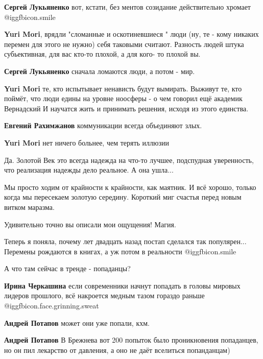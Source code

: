 \begin{itemize}
\begin{itemize}
\textbf{Сергей Лукьяненко} вот, кстати, без ментов созидание действительно хромает  @igg{fbicon.smile} 

\textbf{Yuri Mori}, врядли "сломанные и оскотиневшиеся " люди (ну, те - кому никаких перемен для этого не нужно) себя таковыми считают. Разность людей штука субьективная, для вас кто-то плохой, а для кого- то плохой вы.

\textbf{Сергей Лукьяненко} сначала ломаются люди, а потом - мир.

\textbf{Yuri Mori} те, кто испытывает ненависть будут вымирать. Выживут те, кто поймёт, что люди едины на уровне ноосферы - о чем говорил ещё академик Вернадский
И научатся жить и принимать решения, исходя из этого единства.

\textbf{Евгений Рахимжанов} коммуникации всегда объединяют злых.

\textbf{Yuri Mori} нет ничего больнее, чем терять иллюзии
\end{itemize} %


Да. Золотой Век это всегда надежда на что-то лучшее, подспудная уверенность,
что реализация надежды дело реальное. А она ушла...



Мы просто ходим от крайности к крайности, как маятник. И всё хорошо, только
когда мы пересекаем золотую середину. Короткий миг счастья перед новым витком
маразма.

Удивительно точно вы описали мои ощущения! Магия.


Теперь я поняла, почему лет двадцать назад постап сделался так популярен...
Перемены рождаются в книгах, а уж потом в реальности  @igg{fbicon.smile} 

А что там сейчас в тренде - попаданцы?

\begin{itemize} %
\textbf{Ирина Черкашина} если современники начнут попадать в головы мировых лидеров прошлого, всё накроется медным тазом гораздо раньше  @igg{fbicon.face.grinning.sweat} 

\textbf{Андрей Потапов} может они уже попали, кхм.

\textbf{Андрей Потапов} В Брежнева вот 200 попыток было проникновения попаданцев, но он пил лекарство от давления, а оно не даёт вселиться попанданцам)


\end{itemize}
\end{itemize}
